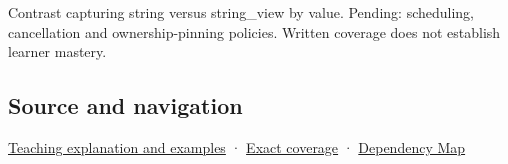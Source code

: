 Contrast capturing string versus string\_view by value. Pending: scheduling, cancellation and ownership-pinning policies. Written coverage does not establish learner mastery.

\subsection{Source and navigation}\label{appendix-aea529eb5175-source-and-navigation}

\hyperref[01-foundations-i-ch003-borrowed-views-and-deferred-work-need-an-owner-story]{Teaching explanation and examples} · \hyperref[appendix-fd090d982a15-m008---parts-113-126]{Exact coverage} · \hyperref[appendix-4ad47bdd269a]{Dependency Map}

